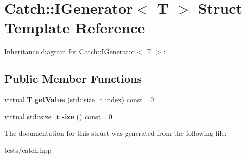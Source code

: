 \hypertarget{struct_catch_1_1_i_generator}{}\section{Catch\+:\+:I\+Generator$<$ T $>$ Struct Template Reference}
\label{struct_catch_1_1_i_generator}


Inheritance diagram for Catch\+:\+:I\+Generator$<$ T $>$\+:
\subsection*{Public Member Functions}
\begin{DoxyCompactItemize}
\item 
\mbox{\label{struct_catch_1_1_i_generator_ad69e937cb66dba3ed9429c42abf4fce3}} 
virtual T {\bfseries get\+Value} (std\+::size\+\_\+t index) const =0
\item 
\mbox{\label{struct_catch_1_1_i_generator_a2e317253b03e838b6065ce69719a198e}} 
virtual std\+::size\+\_\+t {\bfseries size} () const =0
\end{DoxyCompactItemize}


The documentation for this struct was generated from the following file\+:\begin{DoxyCompactItemize}
\item 
tests/catch.\+hpp\end{DoxyCompactItemize}
